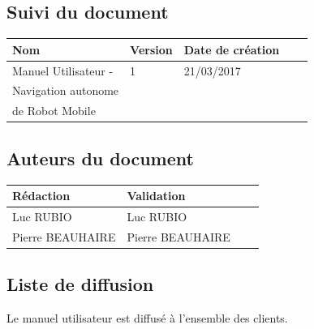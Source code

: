 \documentclass[10pt,a4paper]{article}
\begin{document}
\newpage


\subsection*{Suivi du document}

\begin{center}
    \begin{tabular}{| l | l | l | l | l |}
    \hline
     \rowcolor{gray} Nom & Version & Date de création \\ \hline
    Manuel Utilisateur - & 1 & 21/03/2017 \\ 
    Navigation autonome & & \\ 
    de Robot Mobile &  & \\ \hline
    \end{tabular}
\end{center}


\subsection*{Auteurs du document}

\begin{center}
    \begin{tabular}{| l | l | l | l |}
    \hline
    \rowcolor{gray} Rédaction & Validation \\ \hline
    Luc RUBIO & Luc RUBIO \\  
    Pierre BEAUHAIRE & Pierre BEAUHAIRE \\ \hline
    \end{tabular}
\end{center}


\subsection*{Liste de diffusion}

Le manuel utilisateur est diffusé à l'ensemble des clients.
\end{document}
